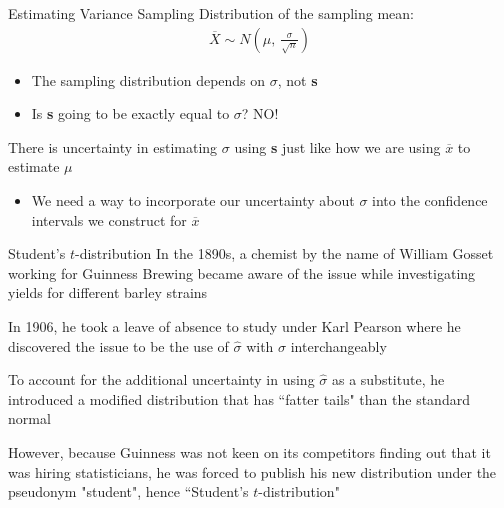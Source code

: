 \documentclass{beamer}
\begin{document}
\begin{frame}{Estimating Variance}
Sampling Distribution of the sampling mean:
\begin{align*}
\overline{X} \sim N \left( \mu, \ \frac{\sigma}{\sqrt{n}} \right)
\end{align*}

\begin{itemize}
\item The sampling distribution depends on $\sigma$, not \textbf{s}
\item Is \textbf{s} going to be exactly equal to $\sigma$? NO!
\end{itemize}

\vspace{15mm}
There is uncertainty in estimating $\sigma$ using \textbf{s} just like how we are using $\overline{x}$ to estimate $\mu$
\begin{itemize}
    \item We need a way to incorporate our uncertainty about $\sigma$ into the confidence intervals we construct for $\overline{x}$
\end{itemize}
\end{frame}

\begin{frame}{Student's $t$-distribution}
\small
In the 1890s, a chemist by the name of William Gosset working for Guinness Brewing became aware of the issue while investigating yields for different barley strains \vspace{3mm}

In 1906, he took a leave of absence to study under Karl Pearson where he discovered the issue to be the use of $\hat{\sigma}$ with $\sigma$ interchangeably  \vspace{3mm}

To account for the additional uncertainty in using $\hat{\sigma}$ as a substitute, he introduced a modified distribution that has ``fatter tails" than the standard normal \vspace{3mm}

However, because Guinness was not keen on its competitors finding out that it was hiring statisticians, he was forced to publish his new distribution under the pseudonym "student", hence ``Student's $t$-distribution"

\end{frame}
\end{document}
